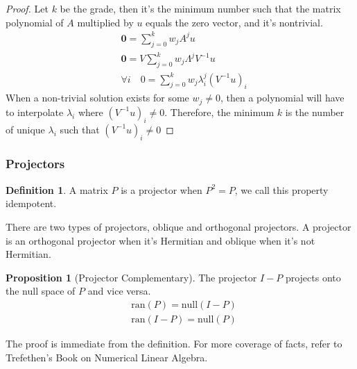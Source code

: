 \documentclass[]{article}
\theoremstyle{definition}
\newtheorem{prop}{Proposition}[section]  %
\newtheorem{definition}{Definition}      %
\begin{document}
            \begin{proof}
                Let $k$ be the grade, then it's the minimum number such that the matrix polynomial of $A$ multiplied by $u$ equals the zero vector, and it's nontrivial. 
                \begin{align}
                    & \mathbf 0 = \sum_{j = 0}^{k}
                    w_jA^{j}u
                    \\
                    & \mathbf 0 = V\sum_{j = 0}^{k} w_j\Lambda^jV^{-1}u
                    \\
                    & \forall i \quad 0 = \sum_{j = 0}^{k} w_j\lambda_i^{j}(V^{-1}u)_i
                \end{align}
                When a non-trivial solution exists for some $w_j \neq 0$, then a polynomial will have to interpolate $\lambda_i$ where $(V^{-1}u)_i\neq 0$. Therefore, the minimum $k$ is the number of unique $\lambda_i$ such that $(V^{-1}u)_i\neq 0$
            \end{proof}
            
        \subsubsection{Projectors}
            \begin{definition}
                A matrix $P$ is a projector when $P^2 = P$, we call this property idempotent. 
            \end{definition}
            There are two types of projectors, oblique and orthogonal projectors. A projector is an orthogonal projector when it's Hermitian and oblique when it's not Hermitian. 
            \begin{prop}[Projector Complementary]
                The projector $I - P$ projects onto the null space of $P$ and vice versa. 
                \begin{align}
                    & \text{ran}(P) = \text{null}(I - P)
                    \\
                    & \text{ran}(I - P) = \text{null}(P)
                \end{align}
            \end{prop}
            The proof is immediate from the definition. For more coverage of facts, refer to Trefethen's Book on Numerical Linear Algebra\cite{book:trefethen}.
\end{document}

